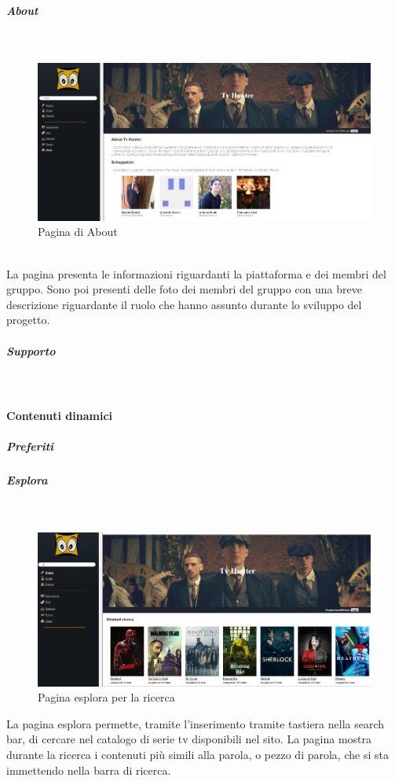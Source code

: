 \subparagraph{About} 
~\\	

\begin{figure}[h!]
	\centerline{\includegraphics[scale=0.4]{img/about.png}}
	\caption{Pagina di About}
	\label{fig:addForm}
\end{figure}	

~\\	
La pagina presenta le informazioni riguardanti la piattaforma e dei membri del gruppo. Sono poi presenti delle foto dei membri del gruppo con una breve descrizione riguardante il ruolo che hanno assunto durante lo sviluppo del progetto. 
~\\	
\subparagraph{Supporto} 

~\\

\paragraph{Contenuti dinamici}   

\subparagraph{Preferiti}

\subparagraph{Esplora}
~\\

\begin{figure}[H]
	\centerline{\includegraphics[scale=0.33]{img/esplora.png}}
	\caption{Pagina esplora per la ricerca}
	\label{fig:addForm}
\end{figure}	
La pagina esplora permette, tramite l'inserimento tramite tastiera nella search bar, di cercare nel catalogo di serie tv disponibili nel sito.
	La pagina mostra durante la ricerca i contenuti più simili alla parola, o pezzo di parola, che si sta immettendo nella barra di ricerca. 



